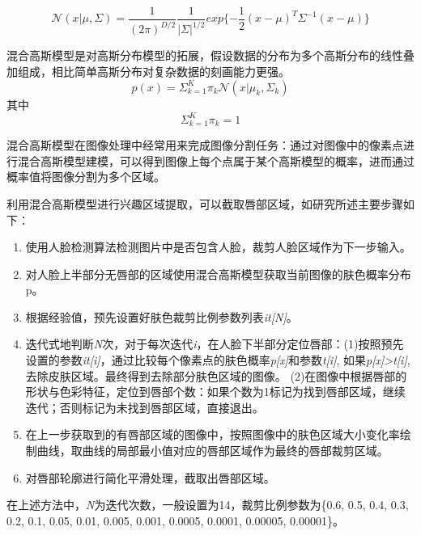 \begin{equation}
\label{eq:equation1}
    \mathcal{N}(x | \mu, \Sigma) = \frac{1}{(2\pi)^{D/2}}\frac{1}{|\Sigma|^{1/2}}exp\{-\frac{1}{2}(x-\mu)^T\Sigma^{-1}(x-\mu)\}
\end{equation}

混合高斯模型是对高斯分布模型的拓展，假设数据的分布为多个高斯分布的线性叠加组成，相比简单高斯分布对复杂数据的刻画能力更强。
\begin{equation}
\label{eq:equation2}
p(x) = \Sigma^K_{k=1}\pi_k\mathcal{N}(x|\mu_k,\Sigma_k)
\end{equation}
其中
\begin{equation}
\label{eq:equation3}
\Sigma^K_{k=1}\pi_k = 1
\end{equation}

混合高斯模型在图像处理中经常用来完成图像分割任务：通过对图像中的像素点进行混合高斯模型建模，可以得到图像上每个点属于某个高斯模型的概率，进而通过概率值将图像分割为多个区域。


利用混合高斯模型进行兴趣区域提取，可以截取唇部区域，如研究\cite{Hu2016Robust}所述主要步骤如下：
\begin{enumerate}
    \item 使用人脸检测算法检测图片中是否包含人脸，裁剪人脸区域作为下一步输入。

    \item 对人脸上半部分无唇部的区域使用混合高斯模型获取当前图像的肤色概率分布p。

    \item 根据经验值，预先设置好肤色裁剪比例参数列表\textit{it[N]}。

    \item 迭代式地判断\textit{N}次，对于每次迭代\textit{i}，在人脸下半部分定位唇部：(1)按照预先设置的参数\textit{it[i]}，通过比较每个像素点的肤色概率\textit{p[x]}和参数\textit{t[i]}, 如果\textit{p[x]>t[i]}, 去除皮肤区域。最终得到去除部分肤色区域的图像。
(2)在图像中根据唇部的形状与色彩特征，定位到唇部个数：如果个数为1标记为找到唇部区域，继续迭代；否则标记为未找到唇部区域，直接退出。

    \item 在上一步获取到的有唇部区域的图像中，按照图像中的肤色区域大小变化率绘制曲线，取曲线的局部最小值对应的唇部区域作为最终的唇部裁剪区域。

    \item 对唇部轮廓进行简化平滑处理，截取出唇部区域。
\end{enumerate}

在上述方法中，\textit{N}为迭代次数，一般设置为14，裁剪比例参数为\{0.6, 0.5, 0.4, 0.3, 0.2, 0.1, 0.05, 0.01, 0.005, 0.001, 0.0005, 0.0001, 0.00005, 0.00001\}。


